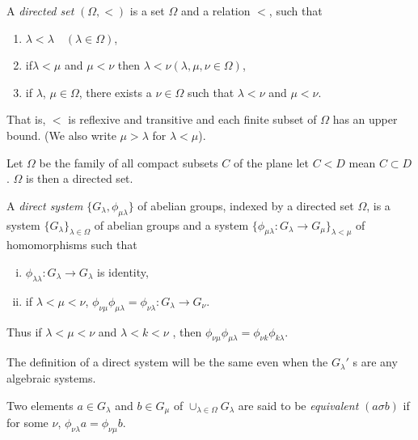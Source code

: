 \begin{defi*}
A {\em{directed set}} $(\Omega, <)$ is a set $\Omega$ and a relation
$<$, such that  
\begin{enumerate}[1)]
\item $\lambda < \lambda \quad (\lambda \in \Omega)$,

\item if\pageoriginale $\lambda < \mu$ and $\mu < \nu$ then $\lambda <
  \nu ( \lambda, \mu, \nu \in \Omega)$, 

\item if $\lambda$, $\mu \in \Omega$, there exists a $\nu \in \Omega$
  such that $\lambda < \nu$ and $\mu < \nu$. 
\end{enumerate}
\end{defi*}

That is, $<$ is reflexive and transitive and each finite subset of
$\Omega$ has an upper bound. (We also write $\mu > \lambda$ for
$\lambda < \mu$). 

\begin{example*}%
Let $\Omega$ be the family of all compact subsets $C$ of the plane let
$C < D$ mean $C \subset D$. $\Omega$ is then a directed set. 
\end{example*}

\begin{defi*}%
A {\em{direct system}} $\{ G_\lambda, \phi_{\mu\lambda} \}$ of abelian
groups, indexed by a directed set $\Omega$, is a system $\{G_\lambda
\}_{\lambda \in \Omega}$ of abelian groups and a system
$\{\phi_{\mu\lambda} : G_\lambda \rightarrow G_{\mu} \}_{\lambda <
  \mu}$ of homomorphisms such that  
\begin{enumerate}[(i)]
\item $\phi_{\lambda \lambda} : G_\lambda \rightarrow G_\lambda$ is
  identity, 

\item if $\lambda < \mu < \nu$, $\phi_{\nu\mu} \phi_{\mu\lambda} =
  \phi_{\nu\lambda }: G_\lambda \rightarrow G_{\nu}$. 
\end{enumerate}
\end{defi*}

\noindent
Thus if $ \lambda < \mu < \nu $ and $\lambda < k < \nu$ , then
$\phi_{\nu\mu} \phi_{\mu\lambda} = \phi_{\nu k} \phi_{k \lambda}$. 

The definition of a direct system will be the same even when the
$G_\lambda'$ s are any algebraic systems. 

\begin{defi*}%
Two elements $a \in G_\lambda$ and $b \in G_\mu$ of $\cup_{\lambda \in
  \Omega} G_\lambda $ are said to be {\em{equivalent}} $(a \sigma b)$
if for some $\nu$, $\phi_{\nu\lambda} a = \phi_{\nu\mu} b $. 
\end{defi*}

